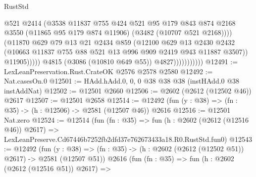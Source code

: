\begin{lexlean}{RustStd}
\begin{coremodule}
                                    @521
                                    @2414
                                    (@3538
                                      @11837
                                      @755
                                      @424
                                      @521
                                      @95
                                      @179
                                      @843
                                      @874
                                      @2168
                                      @3550
                                      (@11865 @95 @179 @874 @11906)
                                      (@3482 (@10707 @521 @2168))))
                                  (@11870
                                    @629
                                    @79
                                    @13
                                    @21
                                    @2434
                                    @859
                                    (@12100
                                      @629
                                      @13
                                      @2430
                                      @2432
                                      (@10663
                                        @11837
                                        @755
                                        @88
                                        @521
                                        @13
                                        @996
                                        @909
                                        @2419
                                        @943
                                        @11887
                                        @3507))
                                    @11905)))))
                          @4815
                          (@3086 (@10810 @649 @55))
                          @4827)))))))))))
@12491 := LexLeanPreservation.Rust.CrateOK @2576 @2578 @2580
@12492 := Nat.casesOn.{0}
@12501 := HAdd.hAdd.{0, 0, 0} @38 @38 @38 (instHAdd.{0} @38 instAddNat)
@12502 := @12501 @2660
@12506 := @2602 (@2612 (@12502 @46)) @2617
@12507 := @12501 @2658
@12514 := @12492 (fun (y : @38) => (fn : @35) -> (h : @12506) -> @2581 (@12507 @46)) @2616
@12516 := @12501 Nat.zero
@12524 := @12514
    (fun (fn : @35) =>
    fun (h : @2602 (@2612 (@12516 @46)) @2617) =>
    LexLeanPreserve.Cd67446b7252fb2dfd37e762673433a18.R0.RustStd.fun0)
@12543 := @12492
    (fun (y : @38) => (fn : @35) -> (h : @2602 (@2612 (@12502 @51)) @2617) -> @2581 (@12507 @51))
    @2616
    (fun (fn : @35) =>
    fun (h : @2602 (@2612 (@12516 @51)) @2617) =>

\end{coremodule}
\end{lexlean}
